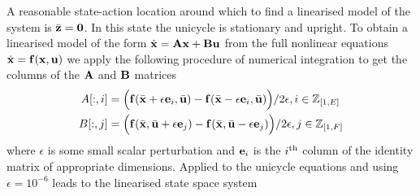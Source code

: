 A reasonable state-action location around which to find a linearised model of the system is $\bar{\mathbf{z}} = \mathbf{0}$. In this state the unicycle is stationary and upright. To obtain a linearised model of the form $\dot{\mathbf{x}} = \mathbf{A}\mathbf{x} + \mathbf{B}\mathbf{u}$ from the full nonlinear equations $\dot{\mathbf{x}} = \mathbf{f}(\mathbf{x},\mathbf{u})$ we apply the following procedure of numerical integration to get the columns of the $\mathbf{A}$ and $\mathbf{B}$ matrices
\begin{align*}
A[:,i] &= \Big( \mathbf{f}(\bar{\mathbf{x}}+\epsilon\mathbf{e}_i,\bar{\mathbf{u}}) - \mathbf{f}(\bar{\mathbf{x}}-\epsilon\mathbf{e}_i,\bar{\mathbf{u}}) \Big)/2\epsilon, i\in \mathbb{Z}_{[1,E]} \\
B[:,j] &= \Big( \mathbf{f}(\bar{\mathbf{x}},\bar{\mathbf{u}}+\epsilon\mathbf{e}_j) - \mathbf{f}(\bar{\mathbf{x}},\bar{\mathbf{u}}-\epsilon\mathbf{e}_j) \Big)/2\epsilon, j\in \mathbb{Z}_{[1,F]}
\end{align*}
where $\epsilon$ is some small scalar perturbation and $\mathbf{e}_i$ is the $i^{\text{th}}$ column of the identity matrix of appropriate dimensions. Applied to the unicycle equations and using $\epsilon = 10^{-6}$ leads to the linearised state space system
